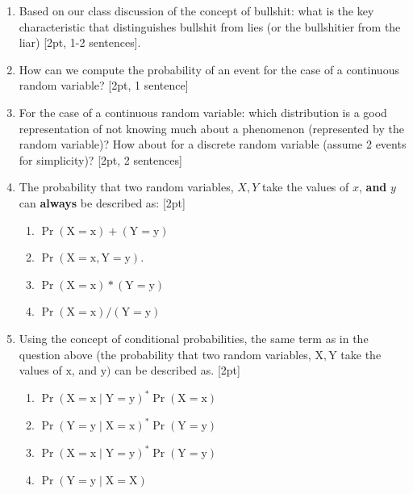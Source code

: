 \documentclass[12pt,notitlepage]{article}
\begin{document}
\begin{enumerate}

	\item  Based on our class discussion of the concept of bullshit: what is the key characteristic that distinguishes bullshit from lies (or the bullshitier from the liar) [2pt, 1-2 sentences].   
	




\vspace{3cm}



	\item How can we compute the probability of an event for the case of a continuous random variable? [2pt, 1 sentence] 
	
\vspace{3cm}

	\item For the case of a continuous random variable: which distribution is a good representation of not knowing much about a phenomenon (represented by the random variable)? How about for a discrete random variable (assume 2 events for simplicity)?
	[2pt, 2 sentences]

\vspace{3cm}

\item 
    The probability that two random variables, $X, Y$ take the values of $x$, \textbf{and} $y$ can \textbf{always} be described as: [2pt]
    \begin{enumerate}[label=\alph*)]
    \item  $\operatorname{Pr}(\mathrm{X}=\mathrm{x})+(\mathrm{Y}=\mathrm{y})$
    \item $\operatorname{Pr}(\mathrm{X}=\mathrm{x}, \mathrm{Y}=\mathrm{y})$.
    \item $\operatorname{Pr}(\mathrm{X}=\mathrm{x}) *(\mathrm{Y}=\mathrm{y})$
    \item $\operatorname{Pr}(\mathrm{X}=\mathrm{x}) /(\mathrm{Y}=\mathrm{y})$
    \end{enumerate}
 \vspace{1cm}
\item Using the concept of conditional probabilities, the same term as in the question above (the probability that two random variables, $\mathrm{X}, \mathrm{Y}$ take the values of $\mathrm{x}$, and $\mathrm{y})$ can be described as. [2pt]
\begin{enumerate}[label=\alph*)]
    \item $\operatorname{Pr}(\mathrm{X}=\mathrm{x} \mid \mathrm{Y}=\mathrm{y})^{*} \operatorname{Pr}(\mathrm{X}=\mathrm{x})$
    \item $\operatorname{Pr}(\mathrm{Y}=\mathrm{y} \mid \mathrm{X}=\mathrm{x})^{*} \operatorname{Pr}(\mathrm{Y}=\mathrm{y})$
    \item $\operatorname{Pr}(\mathrm{X}=\mathrm{x} \mid \mathrm{Y}=\mathrm{y})^{*} \operatorname{Pr}(\mathrm{Y}=\mathrm{y})$
    \item $\operatorname{Pr}(\mathrm{Y}=\mathrm{y} \mid \mathrm{X}=\mathrm{X})$
\end{enumerate}


\end{enumerate}
\end{document}
